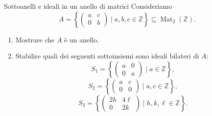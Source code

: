 \documentclass[a4paper]{article}
\begin{document}
\begin{radioactive}
\begin{snippetexercise}{Sottoanelli e ideali in un anello di matrici}
    Consideriamo
    \[
        A=
        \left\{
            \begin{pmatrix}
                a & c \\
                0 & b
            \end{pmatrix}
            \mid
            a,b,c\in\mathbb{Z}
        \right\}
        \subseteq
        \operatorname{Mat}_2(\mathbb{Z}).
    \]

    \begin{enumerate}
        \item Mostrare che \(A\) è un anello.
        \item Stabilire quali dei seguenti sottoinsiemi sono ideali bilateri di \(A\):
        \[
            S_1=
            \left\{
                \begin{pmatrix}
                    a & 0 \\
                    0 & a
                \end{pmatrix}
                \mid
                a\in\mathbb{Z}
            \right\},
        \]
        \[
            S_2=
            \left\{
                \begin{pmatrix}
                    a & c \\
                    0 & 0
                \end{pmatrix}
                \mid
                a,c\in\mathbb{Z}
            \right\},
        \]
        \[
            S_3=
            \left\{
                \begin{pmatrix}
                    2h & 4\ell \\
                    0 & 2k
                \end{pmatrix}
                \mid
                h,k,\ell\in\mathbb{Z}
            \right\}.
        \]
    \end{enumerate}
\end{snippetexercise}
\end{radioactive}
\end{document}
